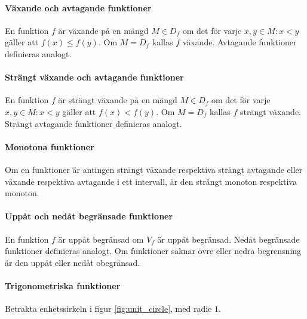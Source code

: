 \paragraph{Växande och avtagande funktioner}

En funktion $f$ är växande på en mängd $M\in D_f$ om det för varje $x,y\in M: x<y$ gäller att $f(x)\leq f(y)$. Om $M=D_f$ kallas $f$ växande. Avtagande funktioner definieras analogt.

\paragraph{Strängt växande och avtagande funktioner}

En funktion $f$ är strängt växande på en mängd $M\in D_f$ om det för varje $x,y\in M: x<y$ gäller att $f(x)<f(y)$. Om $M=D_f$ kallas $f$ strängt växande. Strängt avtagande funktioner definieras analogt.

\paragraph{Monotona funktioner}

Om en funktioner är antingen strängt växande respektiva strängt avtagande eller växande respektiva avtagande i ett intervall, är den strängt monoton respektiva monoton.

\paragraph{Uppåt och nedåt begränsade funktioner}

En funktion $f$ är uppåt begränsad om $V_f$ är uppåt begränsad. Nedåt begränsade funktioner definieras analogt. Om funktioner saknar övre eller nedra begrensning är den uppåt eller nedåt obegränsad.

\paragraph{Trigonometriska funktioner}

Betrakta enhetssirkeln i figur \ref{fig:unit_circle}, med radie $1$.

